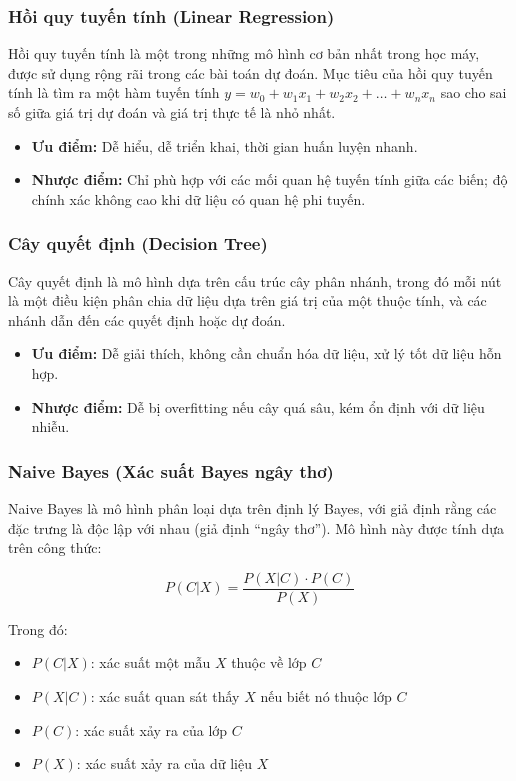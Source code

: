 \subsubsection{ Hồi quy tuyến tính (Linear Regression)}

Hồi quy tuyến tính là một trong những mô hình cơ bản nhất trong học máy, được sử dụng rộng rãi trong các bài toán dự đoán. Mục tiêu của hồi quy tuyến tính là tìm ra một hàm tuyến tính \( y = w_0 + w_1x_1 + w_2x_2 + \ldots + w_nx_n \) sao cho sai số giữa giá trị dự đoán và giá trị thực tế là nhỏ nhất.

\begin{itemize}
    \item \textbf{Ưu điểm:} Dễ hiểu, dễ triển khai, thời gian huấn luyện nhanh.
    \item \textbf{Nhược điểm:} Chỉ phù hợp với các mối quan hệ tuyến tính giữa các biến; độ chính xác không cao khi dữ liệu có quan hệ phi tuyến.
\end{itemize}

\subsubsection{ Cây quyết định (Decision Tree)}

Cây quyết định là mô hình dựa trên cấu trúc cây phân nhánh, trong đó mỗi nút là một điều kiện phân chia dữ liệu dựa trên giá trị của một thuộc tính, và các nhánh dẫn đến các quyết định hoặc dự đoán.

\begin{itemize}
    \item \textbf{Ưu điểm:} Dễ giải thích, không cần chuẩn hóa dữ liệu, xử lý tốt dữ liệu hỗn hợp.
    \item \textbf{Nhược điểm:} Dễ bị overfitting nếu cây quá sâu, kém ổn định với dữ liệu nhiễu.
\end{itemize}

\subsubsection{ Naive Bayes (Xác suất Bayes ngây thơ)}

Naive Bayes là mô hình phân loại dựa trên định lý Bayes, với giả định rằng các đặc trưng là độc lập với nhau (giả định “ngây thơ”). Mô hình này được tính dựa trên công thức:

\[
P(C|X) = \frac{P(X|C) \cdot P(C)}{P(X)}
\]

Trong đó:
\begin{itemize}
    \item \( P(C|X) \): xác suất một mẫu \( X \) thuộc về lớp \( C \)
    \item \( P(X|C) \): xác suất quan sát thấy \( X \) nếu biết nó thuộc lớp \( C \)
    \item \( P(C) \): xác suất xảy ra của lớp \( C \)
    \item \( P(X) \): xác suất xảy ra của dữ liệu \( X \)
\end{itemize}

